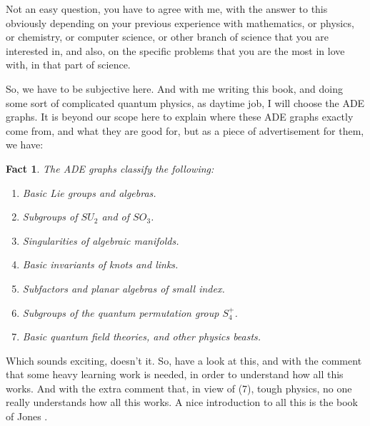 \documentclass[12pt]{amsbook}
\newtheorem{fact}[theorem]{Fact}
\begin{document}
Not an easy question, you have to agree with me, with the answer to this obviously depending on your previous experience with mathematics, or physics, or chemistry, or computer science, or other branch of science that you are interested in, and also, on the specific problems that you are the most in love with, in that part of science.

\bigskip

So, we have to be subjective here. And with me writing this book, and doing some sort of complicated quantum physics, as daytime job, I will choose the ADE graphs. It is beyond our scope here to explain where these ADE graphs exactly come from, and what they are good for, but as a piece of advertisement for them, we have:

\begin{fact}
The ADE graphs classify the following:
\begin{enumerate}
\item Basic Lie groups and algebras.

\item Subgroups of $SU_2$ and of $SO_3$.

\item Singularities of algebraic manifolds.

\item Basic invariants of knots and links.

\item Subfactors and planar algebras of small index.

\item Subgroups of the quantum permutation group $S_4^+$.

\item Basic quantum field theories, and other physics beasts.
\end{enumerate}
\end{fact}

Which sounds exciting, doesn't it. So, have a look at this, and with the comment that some heavy learning work is needed, in order to understand how all this works. And with the extra comment that, in view of (7), tough physics, no one really understands how all this works. A nice introduction to all this is the book of Jones \cite{jon}.

\bigskip
\end{document}
